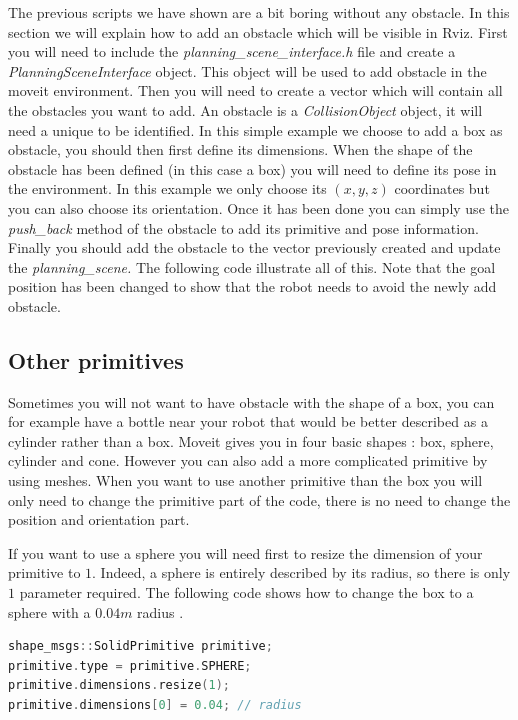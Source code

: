 The previous scripts we have shown are a bit boring without any obstacle. In this section we will explain how to add an obstacle which will be visible in Rviz. First you will need to include the \emph{planning\_scene\_interface.h} file and create a \emph{PlanningSceneInterface} object. This object will be used to add obstacle in the moveit environment. Then you will need to create a vector which will contain all the obstacles you want to add. An obstacle is a \emph{CollisionObject} object, it will need a unique to be identified. In this simple example we choose to add a box as obstacle, you should then first define its dimensions. When the shape of the obstacle has been defined (in this case a box) you will need to define its pose in the environment. In this example we only choose its $(x,y,z)$ coordinates but you can also choose its orientation. Once it has been done you can simply use the \emph{push\_back} method of the obstacle to add its primitive and pose information. Finally you should add the obstacle to the vector previously created and update the \emph{planning\_scene.
}
The following code illustrate all of this. Note that the goal position has been changed to show that the robot needs to avoid the newly add obstacle.





\subsection{Other primitives}
Sometimes you will not want to have obstacle with the shape of a box, you can for example have a bottle near your robot that would be better described as a cylinder rather than a box. Moveit gives you in four basic shapes : box, sphere, cylinder and cone. However you can also add a more complicated primitive by using meshes. When you want to use another primitive than the box you will only need to change the primitive part of the code, there is no need to change the position and orientation part.

If you want to use a sphere you will need first to resize the dimension of your primitive to $1$. Indeed, a sphere is entirely described by its radius, so there is only $1$ parameter required. The following code shows how to change the box to a sphere with a $0.04m$ radius .

\begin{lstlisting}[language=c++]
shape_msgs::SolidPrimitive primitive;
primitive.type = primitive.SPHERE;
primitive.dimensions.resize(1);
primitive.dimensions[0] = 0.04; // radius
\end{lstlisting}

